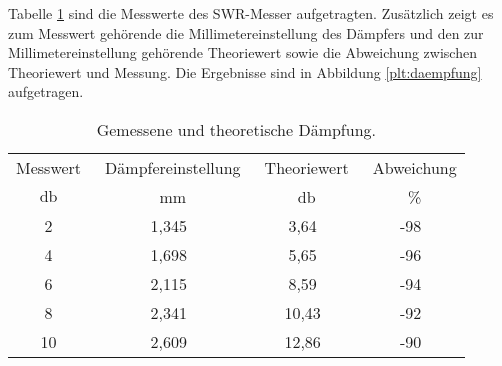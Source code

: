 Tabelle \ref{tab:SWR_Daempfung} sind die Messwerte des SWR-Messer aufgetragten.
Zusätzlich zeigt es zum Messwert gehörende die Millimetereinstellung des Dämpfers und den zur Millimetereinstellung gehörende Theoriewert sowie die Abweichung zwischen Theoriewert und Messung.
Die Ergebnisse sind in Abbildung \ref{plt:daempfung} aufgetragen.
\begin{table}
\centering
\caption{Gemessene und theoretische Dämpfung.}
\begin{tabular}{cccc}
	\toprule
	Messwert& \
	Dämpfereinstellung& \
	Theoriewert& \
	Abweichung \\
	$\si{\decibel}$& \
	$\si{\milli\meter}$& \
	$\si{\decibel}$& \
	\%\\
	\midrule
		2&  1,345&   3,64&-98\\
		4&  1,698&   5,65&-96\\
		6&  2,115&   8,59&-94\\
		8&  2,341&  10,43&-92\\
		10& 2,609&  12,86&-90\\
	\bottomrule
\end{tabular}
\label{tab:SWR_Daempfung}
\end{table}

